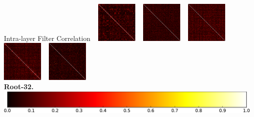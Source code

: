 \documentclass[t,xcolor=dvipsnames]{beamer}
\begin{document}
\begin{frame}[fragile]{Intra-layer Filter Correlation}
~
    \includegraphics[width=0.15\textwidth]{../Figs/Raster/ninroot32/corrcoef_conv4.png}
~
    \includegraphics[width=0.15\textwidth]{../Figs/Raster/ninroot32/corrcoef_conv5.png}
~
    \includegraphics[width=0.15\textwidth]{../Figs/Raster/ninroot32/corrcoef_conv6.png}
~
    \includegraphics[width=0.15\textwidth]{../Figs/Raster/ninroot32/corrcoef_conv8.png}
~
    \includegraphics[width=0.15\textwidth]{../Figs/Raster/ninroot32/corrcoef_conv9.png}\\
\textbf{Root-32.}\\
\includegraphics[width=0.4\linewidth]{../Figs/PDF/colorbar}
\end{frame}

\end{document}
